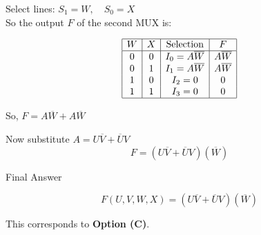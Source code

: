 \documentclass[12pt]{article} \usepackage{amsmath, amssymb}\usepackage{geometry,graphicx}
\begin{document}
Select lines: $S_1 = W, \quad S_0 = X$\\

So the output $ F $ of the second MUX is:

\[
\begin{array}{|c|c|c|c|}
\hline
W & X & \text{Selection} & F \\
\hline
0 & 0 & I_0 = A\overline{W} & A\overline{W} \\
0 & 1 & I_1 = A\overline{W} & A\overline{W} \\
1 & 0 & I_2 = 0 & 0 \\
1 & 1 & I_3 = 0 & 0 \\
\hline

\end{array}
\]

So, $F = A\overline{W} + A\overline{W}$

Now substitute $A = U\overline{V} + \overline{U}V$
\[
F = (U\overline{V} + \overline{U}V)(\overline{W})
\]

Final Answer

\[
\boxed{F(U, V, W, X) = (U\overline{V} + \overline{U}V)(\overline{W})}
\]

\vspace{0.5 cm}
This corresponds to \textbf{Option (C)}.
\end{document}
